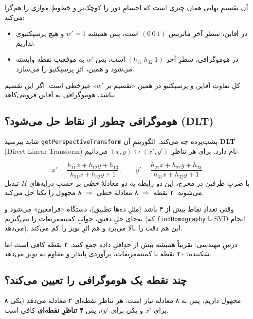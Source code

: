 \documentclass[12pt,a4paper]{article}
\begin{document}
آن تقسیمِ نهایی همان چیزی است که اجسامِ دور را کوچک‌تر و خطوطِ موازی را هم‌گرا می‌کند:

\begin{itemize}
  \item در اَفاین، سطرِ آخرِ ماتریس $(0\ 0\ 1)$ است، پس همیشه $w'=1$ و هیچ پرسپکتیوی نداریم.
  \item در هوموگرافی، سطرِ آخر $(h_{31}\ h_{32}\ 1)$ است، پس $w'$ به موقعیتِ نقطه وابسته می‌شود و همین، اثرِ پرسپکتیو را می‌سازد.
\end{itemize}

\begin{nokte}
کلِ تفاوتِ اَفاین و پرسپکتیو در همین «تقسیم بر $w'$» غیرخطی است. اگر این تقسیم نباشد، هوموگرافی به اَفاین فرومی‌کاهد.
\end{nokte}

\subsection{هوموگرافی چطور از نقاط حل می‌شود؟ (DLT)}

شاید بپرسید \texttt{getPerspectiveTransform} پشتِ‌پرده چه می‌کند. الگوریتمِ آن \textbf{DLT} (Direct Linear Transform) نام دارد. برای هر تناظرِ $(x,y)\leftrightarrow(x',y')$ می‌دانیم:
\begin{riyazi}
\[
x' = \frac{h_{11}x + h_{12}y + h_{13}}{h_{31}x + h_{32}y + 1},\qquad
y' = \frac{h_{21}x + h_{22}y + h_{23}}{h_{31}x + h_{32}y + 1}
\]
با ضربِ طرفین در مخرج، این دو رابطه به دو معادلهٔ \emph{خطی} بر حسبِ درایه‌های $H$ تبدیل می‌شوند. ۴ نقطه $\Rightarrow$ ۸ معادلهٔ خطی $\Rightarrow$ ۸ مجهول را یکتا حل می‌کند.
\end{riyazi}

وقتی تعدادِ نقاط بیش از ۴ باشد (مثلِ ده‌ها تطبیق)، دستگاه «فرا‌معین» می‌شود و به‌جای حلِ دقیق، جوابِ کمینه‌مربعات را می‌گیریم (که \texttt{findHomography} با SVD انجام می‌دهد). این هم دقت را بالا می‌برد و هم اثرِ نویز را کم می‌کند.

\begin{nokte}
درسِ مهندسی: تقریباً همیشه بیش از حدِ‌اقلِ داده جمع کنید. ۴ نقطه کافی است اما شکننده؛ ۴۰ نقطه با کمینه‌مربعات، برآوردی پایدار و مقاوم به نویز می‌دهد.
\end{nokte}

\subsection{چند نقطه یک هوموگرافی را تعیین می‌کند؟}

۸ مجهول داریم، پس به ۸ معادله نیاز است. هر تناظرِ نقطه‌ای ۲ معادله می‌دهد (یکی برای $x'$ و یکی برای $y'$)، پس \textbf{۴ تناظرِ نقطه‌ای} کافی است.
\end{document}
